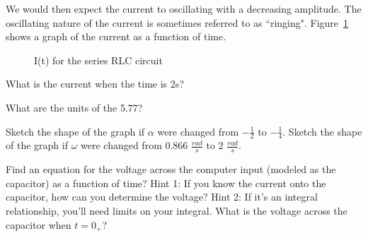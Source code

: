 We would then expect the current to oscillating with a decreasing amplitude. The oscillating nature of the current is sometimes referred to as ``ringing". Figure~\ref{F:6RLCG} shows a graph of the current as a function of time.

\begin{figure}[H]
\begin{center}
\caption{I(t) for the series RLC circuit}
\label{F:6RLCG}
\end{center}
\end{figure}

\begin{alevel}
What is the current when the time is 2s?
\end{alevel}

\begin{blevel}
What are the units of the 5.77?
\end{blevel}

\begin{blevel}
Sketch the shape of the graph if $\alpha$ were changed from $-\frac{1}{2}$ to $-\frac{1}{4}$. Sketch the shape of the graph if $\omega$ were changed from $0.866$ $\frac{rad}{s}$ to $2$ $\frac{rad}{s}$.  
\end{blevel}

\begin{clevel}
Find an equation for the voltage across the computer input (modeled as the capacitor) as a function of time? Hint 1: If you know the current onto the capacitor, how can you determine the voltage? Hint 2: If it's an integral relationship, you'll need limits on your integral. What is the voltage across the capacitor when $t=0_+$?
\end{clevel}


